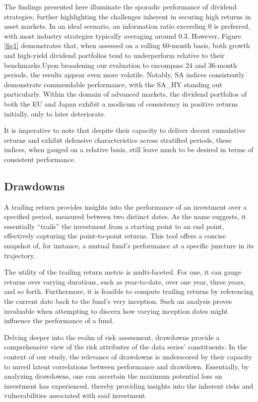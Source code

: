 \documentclass[11pt,preprint, authoryear]{elsarticle}
\numberwithin{equation}{section}
\numberwithin{figure}{section}
\numberwithin{table}{section}
\begin{document}
The findings presented here illuminate the sporadic performance of
dividend strategies, further highlighting the challenges inherent in
securing high returns in asset markets. In an ideal scenario, an
information ratio exceeding 0 is preferred, with most industry
strategies typically averaging around 0.3. However, Figure \ref{fig1}
demonstrates that, when assessed on a rolling 60-month basis, both
growth and high-yield dividend portfolios tend to underperform relative
to their benchmarks.Upon broadening our evaluation to encompass 24 and
36-month periods, the results appear even more volatile. Notably, SA
indices consistently demonstrate commendable performance, with the
SA\_HY standing out particularly. Within the domain of advanced markets,
the dividend portfolios of both the EU and Japan exhibit a modicum of
consistency in positive returns initially, only to later deteriorate.

It is imperative to note that despite their capacity to deliver decent
cumulative returns and exhibit defensive characteristics across
stratified periods, these indices, when gauged on a relative basis,
still leave much to be desired in terms of consistent performance.

\hypertarget{drawdowns}{%
\subsection{Drawdowns}\label{drawdowns}}

A trailing return provides insights into the performance of an
investment over a specified period, measured between two distinct dates.
As the name suggests, it essentially ``trails'' the investment from a
starting point to an end point, effectively capturing the point-to-point
returns. This tool offers a concise snapshot of, for instance, a mutual
fund's performance at a specific juncture in its trajectory.

The utility of the trailing return metric is multi-faceted. For one, it
can gauge returns over varying durations, such as year-to-date, over one
year, three years, and so forth. Furthermore, it is feasible to compute
trailing returns by referencing the current date back to the fund's very
inception. Such an analysis proves invaluable when attempting to discern
how varying inception dates might influence the performance of a fund.

Delving deeper into the realm of risk assessment, drawdowns provide a
comprehensive view of the risk attributes of the data series'
constituents. In the context of our study, the relevance of drawdowns is
underscored by their capacity to unveil latent correlations between
performance and drawdown. Essentially, by analyzing drawdowns, one can
ascertain the maximum potential loss an investment has experienced,
thereby providing insights into the inherent risks and vulnerabilities
associated with said investment.
\end{document}
